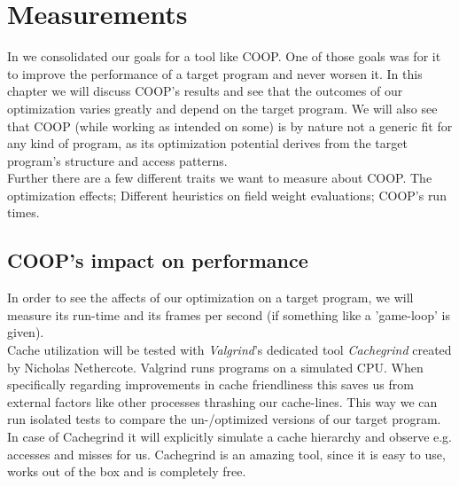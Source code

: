 \chapter{Measurements}
In  we consolidated our goals for a tool like COOP. One of those goals was for it to improve the performance of a target program and never worsen it. In this chapter we will discuss COOP's results and see that the outcomes of our optimization varies greatly and depend on the target program. We will also see that COOP (while working as intended on some) is by nature not a generic fit for any kind of program, as its optimization potential derives from the target program's structure and access patterns.\\
Further there are a few different traits we want to measure about COOP. The optimization effects; Different heuristics on field weight evaluations; COOP's run times.

\section{COOP's impact on performance}
In order to see the affects of our optimization on a target program, we will measure its run-time and its frames per second (if something like a 'game-loop' is given).\\
Cache utilization will be tested with \textit{Valgrind}'s dedicated tool \textit{Cachegrind} created by Nicholas Nethercote. Valgrind runs programs on a simulated CPU. When specifically regarding improvements in cache friendliness this saves us from external factors like other processes thrashing our cache-lines. This way we can run isolated tests to compare the un-/optimized versions of our target program. In case of Cachegrind it will explicitly simulate a cache hierarchy and observe e.g. accesses and misses for us. Cachegrind is an amazing tool, since it is easy to use, works out of the box and is completely free.

